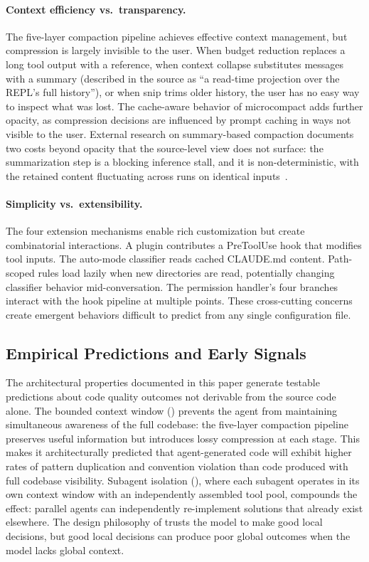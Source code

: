 \paragraph{Context efficiency vs.\ transparency.}
The five-layer compaction pipeline achieves effective context management, but compression is largely invisible to the user. When budget reduction replaces a long tool output with a reference, when context collapse substitutes messages with a summary (described in the source as ``a read-time projection over the REPL's full history''), or when snip trims older history, the user has no easy way to inspect what was lost. The cache-aware behavior of microcompact adds further opacity, as compression decisions are influenced by prompt caching in ways not visible to the user. External research on summary-based compaction documents two costs beyond opacity that the source-level view does not surface: the summarization step is a blocking inference stall, and it is non-deterministic, with the retained content fluctuating across runs on identical inputs~\citep{cim2026parallelcompaction}.

\paragraph{Simplicity vs.\ extensibility.}
The four extension mechanisms enable rich customization but create combinatorial interactions. A plugin contributes a PreToolUse hook that modifies tool inputs. The auto-mode classifier reads cached CLAUDE.md content. Path-scoped rules load lazily when new directories are read, potentially changing classifier behavior mid-conversation. The permission handler's four branches interact with the hook pipeline at multiple points. These cross-cutting concerns create emergent behaviors difficult to predict from any single configuration file.

\subsection{Empirical Predictions and Early Signals}
\label{sec:discuss:empirical}

The architectural properties documented in this paper generate testable predictions about code quality outcomes not derivable from the source code alone. The bounded context window () prevents the agent from maintaining simultaneous awareness of the full codebase: the five-layer compaction pipeline preserves useful information but introduces lossy compression at each stage. This makes it architecturally predicted that agent-generated code will exhibit higher rates of pattern duplication and convention violation than code produced with full codebase visibility. Subagent isolation (), where each subagent operates in its own context window with an independently assembled tool pool, compounds the effect: parallel agents can independently re-implement solutions that already exist elsewhere. The design philosophy of  trusts the model to make good local decisions, but good local decisions can produce poor global outcomes when the model lacks global context.

